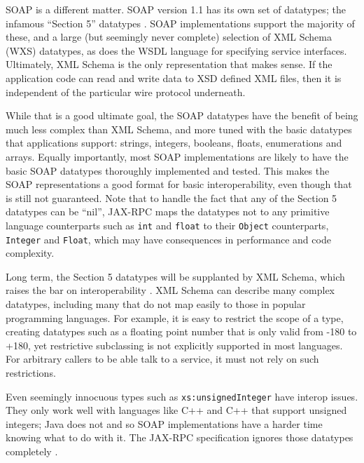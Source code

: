 \documentclass[draft]{report}
\begin{document}
SOAP is a different matter. SOAP version 1.1 has its own set of
datatypes; the infamous ``Section 5'' datatypes \cite{spec:SOAP1.1}.
SOAP implementations support the majority of these, and a large (but
seemingly never complete) selection of XML Schema (WXS) datatypes, as
does the WSDL language for specifying service interfaces. Ultimately,
XML Schema is the only representation that makes sense. If the
application code can read and write data to XSD defined XML files, then
it is independent of the particular wire protocol underneath.

While that is a good ultimate goal, the SOAP datatypes have the benefit
of being much less complex than XML Schema, and more tuned with the
basic datatypes that applications support: strings, integers, booleans,
floats, enumerations and arrays. Equally importantly, most SOAP
implementations are likely to have the basic SOAP datatypes thoroughly
implemented and tested. This makes the SOAP representations a good
format for basic interoperability, even though that is still not
guaranteed. Note that to handle the fact that any of the Section 5
datatypes can be ``nil'', JAX-RPC maps the datatypes not to any
primitive language counterparts such as \verb$int$ and \verb$float$ to
their \verb$Object$ counterparts, \verb$Integer$ and \verb$Float$, which
may have consequences in performance and code complexity.

Long term, the Section 5 datatypes will be supplanted by XML Schema,
which raises the bar on interoperability \cite{ruby:infinity}. XML
Schema can describe many complex datatypes, including many that do not
map easily to those in popular programming languages. For example, it is
easy to restrict the scope of a type, creating datatypes such as a
floating point number that is only valid from -180 to +180, yet
restrictive subclassing is not explicitly supported in most languages.
For arbitrary callers to be able talk to a service, it must not rely on
such restrictions.

Even seemingly innocuous types such as \verb$xs:unsignedInteger$ have
interop issues. They only work well with languages like C++ and C++ that
support unsigned integers; Java does not and so SOAP implementations
have a harder time knowing what to do with it. The JAX-RPC specification
ignores those datatypes completely \cite{spec:JAX-RPC}.
\end{document}
